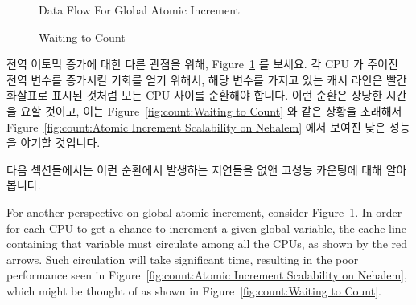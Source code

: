 \begin{figure}[tb]
\begin{center}
\end{center}
\caption{Data Flow For Global Atomic Increment}
\label{fig:count:Data Flow For Global Atomic Increment}
\end{figure}

\begin{figure}[tb]
\begin{center}
\end{center}
\caption{Waiting to Count}
\end{figure}

전역 어토믹 증가에 대한 다른 관점을 위해,
Figure~\ref{fig:count:Data Flow For Global Atomic Increment} 를 보세요.
각 CPU 가 주어진 전역 변수를 증가시킬 기회를 얻기 위해서, 해당 변수를 가지고
있는 캐시 라인은 빨간 화살표로 표시된 것처럼 모든 CPU 사이를 순환해야 합니다.
이런 순환은 상당한 시간을 요할 것이고, 이는
Figure~\ref{fig:count:Waiting to Count} 와 같은 상황을 초래해서
Figure~\ref{fig:count:Atomic Increment Scalability on Nehalem} 에서 보여진 낮은
성능을 야기할 것입니다.

다음 섹션들에서는 이런 순환에서 발생하는 지연들을 없앤 고성능 카운팅에 대해
알아봅니다.
\iffalse

For another perspective on global atomic increment, consider
Figure~\ref{fig:count:Data Flow For Global Atomic Increment}.
In order for each CPU to get a chance to increment a given
global variable, the cache line containing that variable must
circulate among all the CPUs, as shown by the red arrows.
Such circulation will take significant time, resulting in
the poor performance seen in
Figure~\ref{fig:count:Atomic Increment Scalability on Nehalem},
which might be thought of as shown in
Figure~\ref{fig:count:Waiting to Count}.

